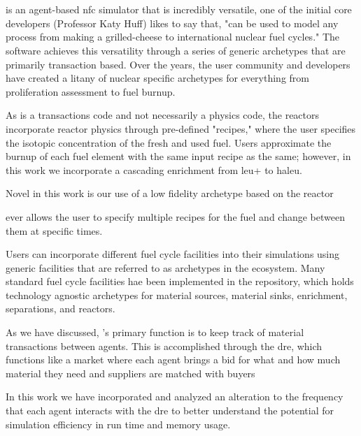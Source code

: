 \section{\cyclus}
\cyclus is an agent-based \gls{nfc} simulator that is incredibly
versatile, one of the initial core developers (Professor Katy Huff)
likes to say that, "\cyclus can be used to model any process from making
a grilled-cheese to international nuclear fuel cycles." The software
achieves this versatility through a series of generic archetypes that are
primarily transaction based. Over the years, the user community and
developers have created a litany of nuclear specific archetypes for
everything from proliferation assessment to fuel burnup.

As \cyclus is a transactions code and not necessarily a physics code,
the reactors incorporate reactor physics through pre-defined "recipes,"
where the user specifies the isotopic concentration of the fresh and
used fuel. Users approximate the burnup of each fuel element with the
same input recipe as the same; however, in this work we incorporate a
cascading enrichment from \gls{leu+} to \gls{haleu}.

Novel in this work is our use of a low fidelity archetype based on the
\cycamore reactor %

\gls{ever} allows the user to specify multiple recipes for the fuel and
change between them at specific times.

Users can incorporate different fuel cycle facilities into their \cyclus
simulations using generic facilities that are referred to as archetypes
in the \cyclus ecosystem. Many standard fuel cycle facilities hae been
implemented in the \cycamore repository, which holds technology agnostic
archetypes for material sources, material sinks, enrichment,
separations, and reactors.

As we have discussed, \cyclus's primary function is to keep track of
material transactions between agents. This is accomplished through the
\gls{dre}, which functions like a market where each agent brings a bid
for what and how much material they need and suppliers are matched with
buyers %

In this work we have incorporated and analyzed an alteration to the
frequency that each agent interacts with the \gls{dre} to better
understand the potential for simulation efficiency in run time and
memory usage.

